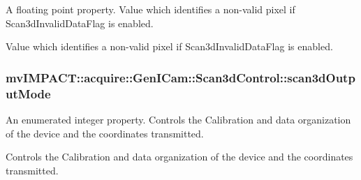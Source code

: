 A floating point property. Value which identifies a non-\/valid pixel if Scan3d\+Invalid\+Data\+Flag is enabled. 

Value which identifies a non-\/valid pixel if Scan3d\+Invalid\+Data\+Flag is enabled. \hypertarget{classmv_i_m_p_a_c_t_1_1acquire_1_1_gen_i_cam_1_1_scan3d_control_aaa900a32cb8627e184f93bc0fa8b4767}{
\subsubsection[{scan3d\+Output\+Mode}]{ mv\+I\+M\+P\+A\+C\+T\+::acquire\+::\+Gen\+I\+Cam\+::\+Scan3d\+Control\+::scan3d\+Output\+Mode}}\label{classmv_i_m_p_a_c_t_1_1acquire_1_1_gen_i_cam_1_1_scan3d_control_aaa900a32cb8627e184f93bc0fa8b4767}


An enumerated integer property. Controls the Calibration and data organization of the device and the coordinates transmitted. 

Controls the Calibration and data organization of the device and the coordinates transmitted.

